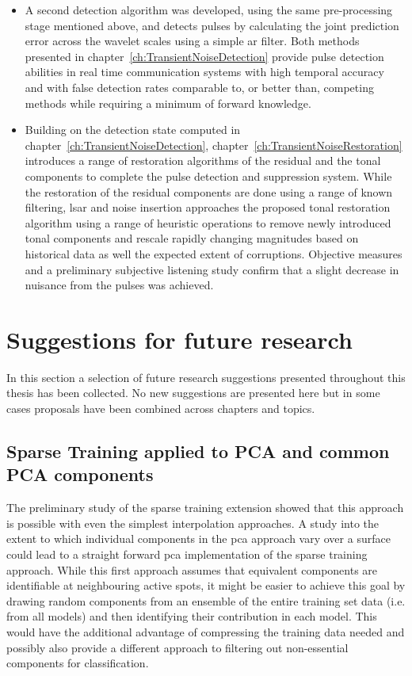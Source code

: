 \begin{itemize}
  \item A second detection algorithm was developed, using the same pre-processing stage mentioned above, and detects pulses by calculating the joint prediction error across the wavelet scales using a simple \gls{ar} filter. Both methods presented in chapter~\ref{ch:TransientNoiseDetection} provide pulse detection abilities in real time communication systems with high temporal accuracy and with false detection rates comparable to, or better than, competing methods while requiring a minimum of forward knowledge.
  \item Building on the detection state computed in chapter~\ref{ch:TransientNoiseDetection}, chapter~\ref{ch:TransientNoiseRestoration} introduces a range of restoration algorithms of the residual and the tonal components to complete the pulse detection and suppression system. While the restoration of the residual components are done using a range of known filtering, \gls{lsar} and noise insertion approaches the proposed tonal restoration algorithm using a range of heuristic operations to remove newly introduced tonal components and rescale rapidly changing magnitudes based on historical data as well the expected extent of corruptions. Objective measures and a preliminary subjective listening study confirm that a slight decrease in nuisance from the pulses was achieved.
\end{itemize}


\section{Suggestions for future research}
In this section a selection of future research suggestions presented throughout this thesis has been collected. No new suggestions are presented here but in some cases proposals have been combined across chapters and topics.

\subsection{Sparse Training applied to PCA and common PCA components}
The preliminary study of the sparse training extension showed that this approach is possible with even the simplest interpolation approaches. A study into the extent to which individual components in the \gls{pca} approach vary over a surface could lead to a straight forward \gls{pca} implementation of the sparse training approach. While this first approach assumes that equivalent components are identifiable at neighbouring active spots, it might be easier to achieve this goal by drawing random components from an ensemble of the entire training set data (i.e. from all models) and then identifying their contribution in each model. This would have the additional advantage of compressing the training data needed and possibly also provide a different approach to filtering out non-essential components for classification.

